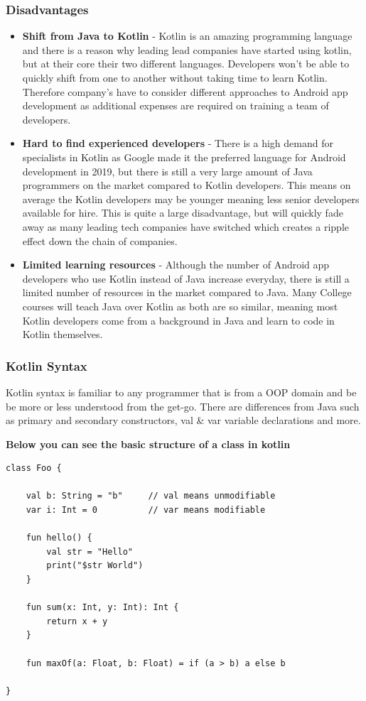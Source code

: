 \newpage

\subsubsection{Disadvantages}

\begin{itemize}
    \item \textbf{Shift from Java to Kotlin} - Kotlin is an amazing programming language and there is a reason why leading lead companies have started using kotlin, but at their core their two different languages. Developers won't be able to quickly shift from one to another without taking time to learn Kotlin. Therefore company's have to consider different approaches to Android app development as additional expenses are required on training a team of developers. 
    \item \textbf{Hard to find experienced developers} - There is a high demand for specialists in Kotlin as Google made it the preferred language for Android development in 2019, but there is still a very large amount of Java programmers on the market compared to Kotlin developers. This means on average the Kotlin developers may be younger meaning less senior developers available for hire. This is quite a large disadvantage, but will quickly fade away as many leading tech companies have switched which creates a ripple effect down the chain of companies.
    \item \textbf{Limited learning resources} - Although the number of Android app developers who use Kotlin instead of Java increase everyday, there is still a limited number of resources in the market compared to Java. Many College courses will teach Java over Kotlin as both are so similar, meaning most Kotlin developers come from a background in Java and learn to code in Kotlin themselves.
\end{itemize}

\newpage
\subsubsection{Kotlin Syntax}
Kotlin syntax is familiar to any programmer that is from a OOP domain and be be more or less understood from the get-go. There are differences from Java such as primary and secondary constructors, val \& var variable declarations and more.
\newline

\textbf{Below you can see the basic structure of a class in kotlin}
\begin{lstlisting}
class Foo {

    val b: String = "b"     // val means unmodifiable
    var i: Int = 0          // var means modifiable

    fun hello() {
        val str = "Hello"
        print("$str World")
    }

    fun sum(x: Int, y: Int): Int {
        return x + y
    }

    fun maxOf(a: Float, b: Float) = if (a > b) a else b

}
\end{lstlisting}

